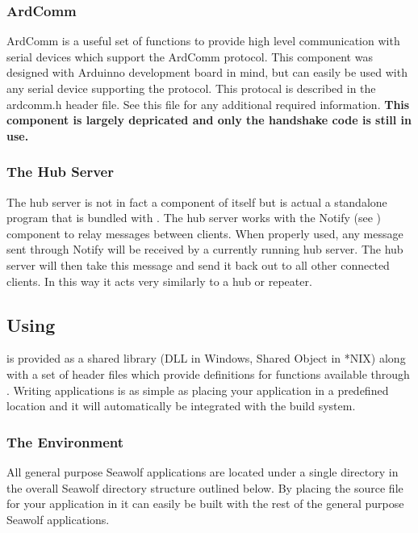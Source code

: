 \subsubsection{ArdComm} \label{overviewardcomm}
ArdComm is a useful set of functions to provide high level communication with
serial devices which support the ArdComm protocol. This component was designed
with Arduinno development board in mind, but can easily be used with any serial
device supporting the protocol. This protocal is described in the ardcomm.h
header file. See this file for any additional required information. \textbf{This
  component is largely depricated and only the handshake code is still in use.}

\subsubsection{The Hub Server} \label{overviewhub}
The hub server is not in fact a component of \libseawolf{} itself but is actual a
standalone program that is bundled with \libseawolf{}. The hub server works with
the Notify (see ) component to relay messages
between clients. When properly used, any message sent through Notify will be
received by a currently running hub server. The hub server will then take this
message and send it back out to all other connected clients. In this way it acts
very similarly to a hub or repeater.

\subsection {Using \libseawolf} \label{usinglibseawolf}
\libseawolf{} is provided as a shared library (DLL in Windows, Shared Object in
*NIX) along with a set of header files which provide definitions for functions
available through \libseawolf{}. Writing applications is as simple as placing
your application in a predefined location and it will automatically be
integrated with the build system.

\subsubsection{The Environment} \label{environment}
All general purpose Seawolf applications are located under a single directory in
the overall Seawolf directory structure outlined below. By placing the source
file for your application in  it can easily be
built with the rest of the general purpose Seawolf applications.

